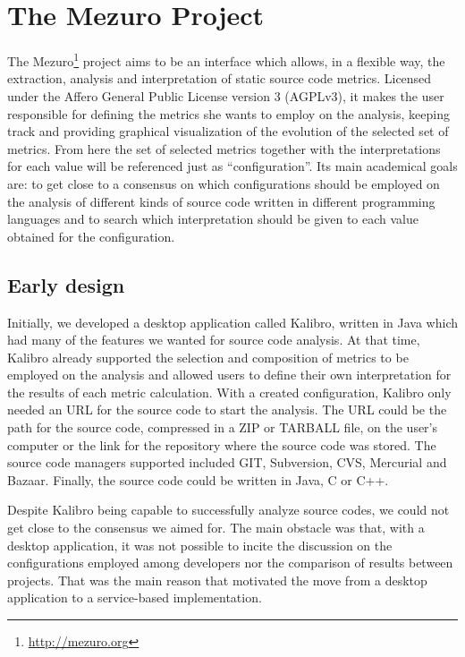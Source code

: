 \newpage
\section{The Mezuro Project}
\label{sec:mezuro}

The Mezuro\footnote{\url{http://mezuro.org}} project aims to be an interface which allows, in a flexible way, the extraction, analysis and interpretation of static source code metrics. Licensed under the Affero General Public License version 3 (AGPLv3), it makes the user responsible for defining the metrics she wants to employ on the analysis, keeping track and providing graphical visualization of the evolution of the selected set of metrics. From here the set of selected metrics together with the interpretations for each value  will be referenced just as ``configuration''. Its main academical goals are: to get close to a consensus on which configurations should be employed on the analysis of different kinds of source code written in different programming languages and to search which interpretation should be given to each value obtained for the configuration.

\subsection{Early design}
\label{subsec:early-design}

Initially, we developed a desktop application called Kalibro, written in Java which had many of the features we wanted for source code analysis. At that time, Kalibro already supported the selection and composition of metrics to be employed on the analysis and allowed users to define their own interpretation for the results of each metric calculation. With a created configuration, Kalibro only needed an URL for the source code to start the analysis. The URL could be the path for the source code, compressed in a ZIP or TARBALL file, on the user's computer or the link for the repository where the source code was stored. The source code managers supported included GIT, Subversion, CVS, Mercurial and Bazaar. Finally, the source code could be written in Java, C or C++.

Despite Kalibro being capable to successfully analyze source codes, we could not get close to the consensus we aimed for. The main obstacle was that, with a desktop application, it was not possible to incite the discussion on the configurations employed among developers nor the comparison of results between projects. That was the main reason that motivated the move from a desktop application to a service-based implementation.

